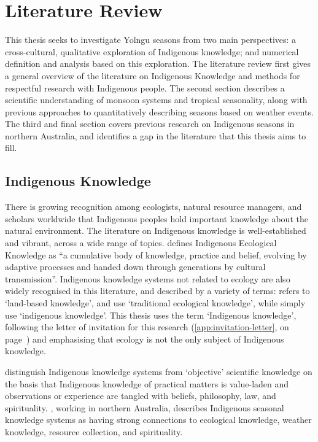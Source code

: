 \chapter{Literature Review}
\label{ch:lit-review}

This thesis seeks to investigate Yolngu seasons from two main perspectives:
a cross-cultural, qualitative exploration of Indigenous knowledge; and
numerical definition and analysis based on this exploration.
%
The literature review first gives a general
overview of the literature on Indigenous Knowledge and methods for respectful
research with Indigenous people.  The second section describes a scientific
understanding of monsoon systems and tropical seasonality, along with previous
approaches to quantitatively describing seasons based on weather events.
The third and final section covers previous research on Indigenous seasons in northern
Australia, and identifies a gap in the literature that this thesis aims to fill.


\section{Indigenous Knowledge}
\label{sec:lit-iek}

There is growing recognition among ecologists, natural resource managers, and
scholars worldwide that Indigenous peoples hold important knowledge about the
natural environment.  The literature on Indigenous knowledge
is well-established and vibrant, across a wide range of topics.
\citet{berkes2012} defines Indigenous Ecological Knowledge as ``a cumulative
body of knowledge, practice and belief, evolving by adaptive processes and
handed down through generations by cultural transmission''.
%
Indigenous knowledge systems not related to ecology are also widely recognised in this literature,
and described by a variety of terms:  \citet{clarke2009} refers to `land-based
knowledge', \citet{petheram2010} and \citet{turner2009} use `traditional
ecological knowledge', while \citet{cochran2015} simply use `indigenous
knowledge'.  This thesis uses the term `Indigenous knowledge', following the
letter of invitation for this research (\cref{app:invitation-letter}, on page~\pageref{app:invitation-letter}) and
emphasising that ecology is not the only subject of Indigenous knowledge.


\citet{turner2009} distinguish Indigenous knowledge systems from `objective'
scientific knowledge on the basis that Indigenous knowledge of practical
matters is value-laden and observations or experience are tangled with beliefs,
philosophy, law, and spirituality.  \citet{woodward2012b}, working in northern
Australia, describes Indigenous seasonal knowledge systems as having strong connections
to ecological knowledge, weather knowledge, resource collection, and spirituality.

